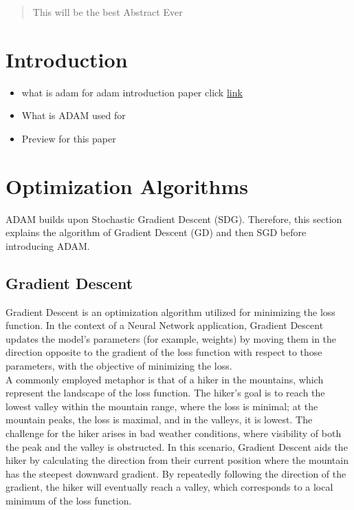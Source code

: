 \documentclass[journal]{IEEEtran}
\begin{document}
\tableofcontents 
\vspace{1.5cm}

\begin{abstract}
    This will be the best Abstract Ever 
\end{abstract}

\section{Introduction}

\begin{itemize}
    \item what is adam
      for adam introduction paper click \href{https://arxiv.org/abs/1412.6980}{link}
    \item What is ADAM used for
    \item Preview for this paper
\end{itemize}


\section{Optimization Algorithms}
ADAM builds upon Stochastic Gradient Descent (SDG). Therefore, this section explains the algorithm of Gradient Descent (GD) and then SGD before introducing ADAM.
\subsection{Gradient Descent}
Gradient Descent is an optimization algorithm utilized for minimizing the loss function. In the context of a Neural Network application, Gradient Descent updates the model's parameters (for example, weights) by moving them in the direction opposite to the gradient of the loss function with respect to those parameters, with the objective of minimizing the loss.  \\
A commonly employed metaphor is that of a hiker in the mountains, which represent the landscape of the loss function. The hiker's goal is to reach the lowest valley within the mountain range, where the loss is minimal; at the mountain peaks, the loss is maximal, and in the valleys, it is lowest. The challenge for the hiker arises in bad weather conditions, where visibility of both the peak and the valley is obstructed. In this scenario, Gradient Descent aids the hiker by calculating the direction from their current position where the mountain has the steepest downward gradient. By repeatedly following the direction of the gradient, the hiker will eventually reach a valley, which corresponds to a local minimum of the loss function. \\
\end{document}
